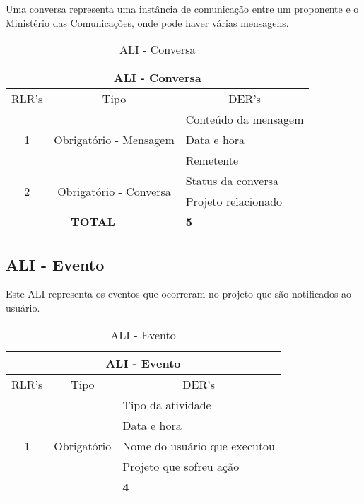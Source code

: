       Uma conversa representa uma instância de comunicação entre um proponente e o Ministério das Comunicações,
      onde pode haver várias mensagens.
    
      \begin{table}[!h]
      \centering
      \caption{ALI - Conversa}
      \label{my-label}
      \begin{tabular}{|c|c|l|}
      \hline
      \multicolumn{3}{|c|}{ALI - Conversa}                                                    \\ \hline
      \multicolumn{1}{|l|}{RLR's} & Tipo                         & \multicolumn{1}{c|}{DER's} \\ \hline
      \multirow{3}{*}{1}          & \multirow{3}{*}{Obrigatório - Mensagem} & Conteúdo da mensagem       \\ \cline{3-3} 
				  &                              & Data e hora                \\ \cline{3-3} 
				  &                              & Remetente                  \\ \hline
      \multirow{2}{*}{2}          & \multirow{2}{*}{Obrigatório - Conversa} & Status da conversa         \\ \cline{3-3} 
				  &                              & Projeto relacionado        \\ \hline
      \multicolumn{2}{|c|}{\textbf{TOTAL}} & \textbf{5} \\ \hline
      \end{tabular}
      \end{table}
     
    \subsection{ALI - Evento}
      
      Este ALI representa os eventos que ocorreram no projeto que são notificados ao usuário.
      
        \begin{table}[!h]
	\centering
	\caption{ALI - Evento}
	\label{ali_evento}
	\begin{tabular}{|c|c|l|}
	\hline
	\multicolumn{3}{|c|}{ALI - Evento}                                              \\ \hline
	\multicolumn{1}{|l|}{RLR's} & Tipo                          & \multicolumn{1}{c|}{DER's} \\ \hline
	\multirow{5}{*}{1}         & \multirow{5}{*}{Obrigatório} & Tipo da atividade          \\ \cline{3-3} 
				    &                               & Data e hora                        \\ \cline{3-3} 
				    &                               & Nome do usuário que executou                      \\ \cline{3-3} 
				    &                               & Projeto que sofreu ação    \\ \hline
	\multicolumn{2}{|c|}{\textbf{TOTAL}} & \textbf{4} \\ \hline
	\end{tabular}
	\end{table}      
     
